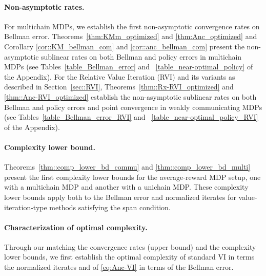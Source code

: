 \documentclass{article} %
\begin{document}
\paragraph{Non-asymptotic rates.}
For multichain MDPs, we establish the first non-asymptotic convergence rates on Bellman error. Theorems~\ref{thm:KMm_optimized} and \ref{thm:Anc_optimized} and Corollary \ref{cor::KM_bellman_com} and \ref{cor::anc_bellman_com} present the non-asymptotic sublinear rates on both Bellman and policy errors in multichain MDPs (see Tables~\ref{table_Bellman_error} and ~\ref{table_near-optimal_policy} of the Appendix).
For the Relative Value Iteration (RVI) and its variants as described in Section~\ref{sec::RVI}, Theorems~\ref{thm::Rx-RVI_optimized} and \ref{thm::Anc-RVI_optimized} establish the non-asymptotic sublinear rates on both Bellman and policy errors and point convergence in weakly communicating MDPs (see Tables~\ref{table_Bellman_error_RVI} and ~\ref{table_near-optimal_policy_RVI} of the Appendix). 


\paragraph{Complexity lower bound.} Theorems~\ref{thm::comp_lower_bd_commu} and \ref{thm::comp_lower_bd_multi} present the first complexity lower bounds for the average-reward MDP setup, one with a multichain MDP and another with a unichain MDP. These complexity lower bounds apply both to the Bellman error and normalized iterates for value-iteration-type methods satisfying the span condition. 

\paragraph{Characterization of optimal complexity.}
Through our matching the convergence rates (upper bound) and the complexity lower bounds, we first establish the optimal complexity of standard VI in terms the normalized iterates and of \ref{eq:Anc-VI} in terms of the Bellman error.
\end{document}
